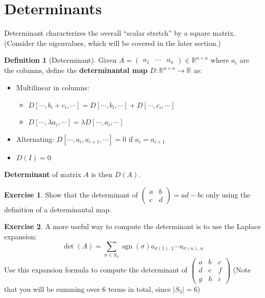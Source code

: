 \documentclass[12pt, a4paper]{article}
\newcommand{\R}{\mathbb{R}}
\DeclareMathOperator{\sgn}{sgn}
\theoremstyle{remark}
\theoremstyle{definition}
\newtheorem{definition}{Definition}
\newtheorem{exercise}{Exercise}
\numberwithin{equation}{section}
\numberwithin{definition}{section}
\numberwithin{example}{section}
\numberwithin{exercise}{section}
\numberwithin{remark}{section}
\numberwithin{figure}{section}
\begin{document}
\section{Determinants}
Determinant characterizes the overall ``scalar stretch'' by a square matrix.
(Consider the eigenvalues, which will be covered in the later section.)
\begin{definition}[Determinant]
    Given $A = 
    \begin{pmatrix}
        a_1 & \cdots & a_n
    \end{pmatrix}
    \in \R^{n \times n}$
    where $a_i$ are the columns,
    define the \textbf{determinantal map} $D : \R^{n \times n} \rightarrow \R$ as:
    \begin{itemize}
        \item Multilinear in columns:
            \begin{itemize}
                \item $D \left[ \cdots, b_i + c_i, \cdots \right] = D \left[ \cdots, b_i, \cdots \right] + D \left[ \cdots, c_i, \cdots \right]$
                \item $D \left[ \cdots, \lambda a_i, \cdots \right] = \lambda D \left[ \cdots, a_i, \cdots \right]$
            \end{itemize}
        \item Alternating: $D[\cdots, a_i, a_{i+1}, \cdots] = 0$ if $a_i = a_{i+1}$
        \item $D\left( I \right) = 0$
    \end{itemize}
    \textbf{Determinant} of matrix $A$ is then $D(A)$.
\end{definition}
\begin{exercise}
    Show that the determinant of $
    \begin{pmatrix}
        a & b \\ c & d
    \end{pmatrix} = ad-bc
    $
    only using the definition of a determinantal map.
\end{exercise}
\begin{exercise}
    A more useful way to compute the determinant is to use the Laplace expansion:
    \begin{equation*}
        \det (A) = \sum_{\sigma \in S_n} \sgn \left( \sigma \right) a_{\sigma(1), 1} \cdots a_{\sigma(n),n}
    \end{equation*}
    Use this expansion formula to compute the determinant of $
    \begin{pmatrix}
        a & b & c \\
        d & e & f \\
        g & h & i
    \end{pmatrix}
    $
    (Note that you will be summing over 6 terms in total, since $|S_3| = 6$)
\end{exercise}
\end{document}
